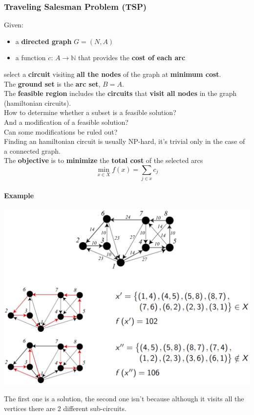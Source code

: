 \newpage

\subsubsection{Traveling Salesman Problem (TSP)}
Given:
\begin{itemize}
	\item a \textbf{directed graph} $G = (N, A)$
	\item a function $c : \, A \rightarrow \mathbb{N}$ that provides the \textbf{cost of each arc}
\end{itemize}
select a \textbf{circuit} visiting \textbf{all the nodes} of the graph at \textbf{minimum cost}.\\

The \textbf{ground set} is the \textbf{arc set}, $B = A$.\\

The \textbf{feasible region} includes the \textbf{circuits} that \textbf{visit all nodes} in the graph (hamiltonian circuits).\\

How to determine whether a subset is a feasible solution? \\
And a modification of a feasible solution? \\
Can some modifications be ruled out? \\
Finding an hamiltonian circuit is usually NP-hard, it's trivial only in the case of a connected graph. \\

The \textbf{objective} is to \textbf{minimize} the \textbf{total cost} of the selected arcs
$$ \min_{x \in X} f(x) = \sum_{j \in x} c_j $$

\newpage

\paragraph{Example}
\begin{center}
	\includegraphics[width=\columnwidth]{img/TSP1}
\end{center}
The first one is a solution, the second one isn't because although it visits all the vertices there are 2 different sub-circuits.\\


